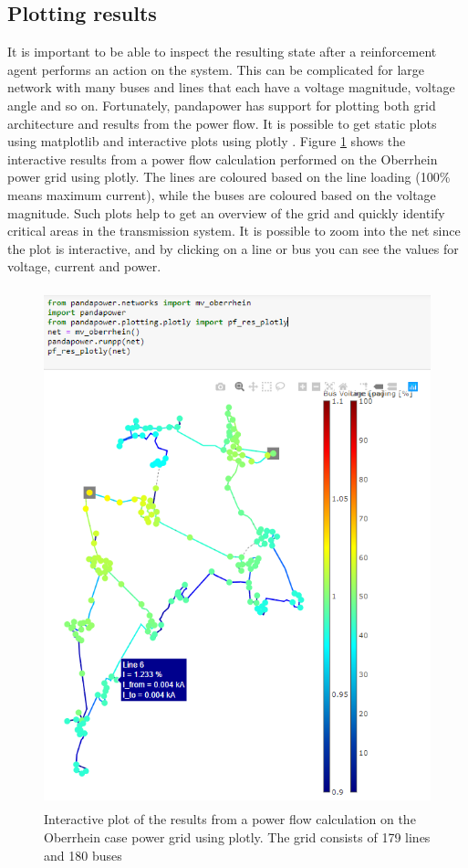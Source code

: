 \documentclass[class=book, crop=false, 11pt]{standalone}
\begin{document}
\subsection{Plotting results}
It is important to be able to inspect the resulting state after a reinforcement agent performs an action on the system. This can be complicated for large network with many buses and lines that each have a voltage magnitude, voltage angle and so on. Fortunately, pandapower has support for plotting both grid architecture and results from the power flow. It is possible to get static plots using matplotlib and interactive plots using plotly \cite{plotly}. Figure \ref{fig:method:oberrhein_grid_results_plotly} shows the interactive results from a power flow calculation performed on the Oberrhein power grid using plotly. The lines are coloured based on the line loading (100\% means maximum current), while the buses are coloured based on the voltage magnitude. Such plots help to get an overview of the grid and quickly identify critical areas in the transmission system. It is possible to zoom into the net since the plot is interactive, and by clicking on a line or bus you can see the values for voltage, current and power.


\begin{figure}[H]
    \center
    \includegraphics[height=15cm, width=12cm]{figures/results_pp_oberrhein.png}
    \caption[size = 9]{Interactive plot of the results from a power flow calculation on the Oberrhein case power grid using plotly. The grid consists of 179 lines and 180 buses}
    \label{fig:method:oberrhein_grid_results_plotly}
\end{figure}
\end{document}
